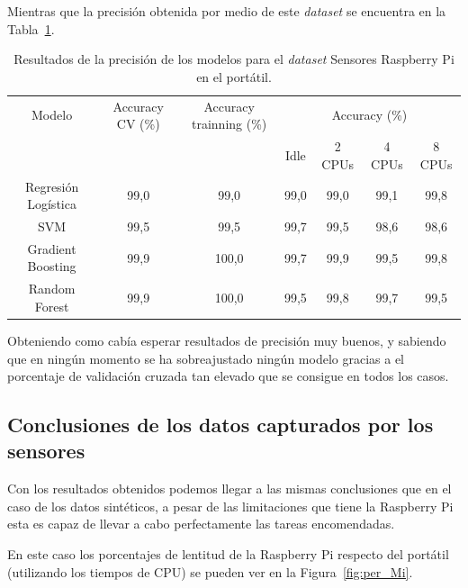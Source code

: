 \documentclass[a4paper, 12pt]{book}
\begin{document}
Mientras que la precisión obtenida por medio de este \textit{dataset} se encuentra en la Tabla~\ref{tab:acc_senspc}.\\
\begin{table}[htb]
\renewcommand{\arraystretch}{1.5}
\begin{adjustbox}{width=\textwidth}
\centering
    \begin{tabular}{c  c  c  c  c  c  c}
    \toprule
    Modelo & Accuracy CV (\%) & Accuracy trainning (\%) & \multicolumn{4}{c}{Accuracy (\%)} \\
    \cline{4-7}
     &  &   &  Idle & 2 CPUs & 4 CPUs & 8 CPUs \\
     \midrule
     Regresión Logística & 99,0 & 99,0 & 99,0 & 99,0 & 99,1 & 99,8\\
     SVM & 99,5 & 99,5 & 99,7 & 99,5 & 98,6 & 98,6\\
     Gradient Boosting & 99,9 & 100,0 & 99,7 & 99,9 & 99,5 & 99,8\\
     Random Forest & 99,9 & 100,0 & 99,5 & 99,8 & 99,7 & 99,5\\
    \bottomrule
    \end{tabular}
\end{adjustbox}
\caption{Resultados de la precisión de los modelos para el \textit{dataset} Sensores Raspberry Pi en el portátil.}
\label{tab:acc_senspc}
\end{table}

Obteniendo como cabía esperar resultados de precisión muy buenos, y sabiendo que en ningún momento se ha sobreajustado ningún modelo gracias a el porcentaje de validación cruzada tan elevado que se consigue en todos los casos.

\subsection{Conclusiones de los datos capturados por los sensores}
\label{subsec:conclusiones_sensados}

Con los resultados obtenidos podemos llegar a las mismas conclusiones que en el caso de los datos sintéticos, a pesar de las limitaciones que tiene la Raspberry Pi esta es capaz de llevar a cabo perfectamente las tareas encomendadas.

En este caso los porcentajes de lentitud de la Raspberry Pi respecto del portátil (utilizando los tiempos de CPU) se pueden ver en la Figura~\ref{fig:per_Mi}.
\end{document}

